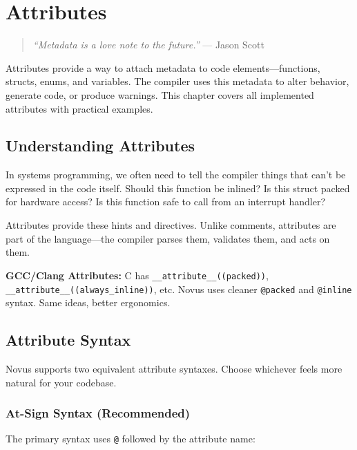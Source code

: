 \chapter{Attributes}
\label{ch:attributes}

\begin{quote}
\textit{``Metadata is a love note to the future.''} --- Jason Scott
\end{quote}

Attributes provide a way to attach metadata to code elements---functions, structs, enums, and variables. The compiler uses this metadata to alter behavior, generate code, or produce warnings. This chapter covers all implemented attributes with practical examples.

\section{Understanding Attributes}
\label{sec:understanding-attributes}

In systems programming, we often need to tell the compiler things that can't be expressed in the code itself. Should this function be inlined? Is this struct packed for hardware access? Is this function safe to call from an interrupt handler?

Attributes provide these hints and directives. Unlike comments, attributes are part of the language---the compiler parses them, validates them, and acts on them.

\begin{comingfromc}
\textbf{GCC/Clang Attributes:} C has \texttt{\_\_attribute\_\_((packed))}, \texttt{\_\_attribute\_\_((always\_inline))}, etc. Novus uses cleaner \texttt{@packed} and \texttt{@inline} syntax. Same ideas, better ergonomics.
\end{comingfromc}

\section{Attribute Syntax}
\label{sec:attribute-syntax}

Novus supports two equivalent attribute syntaxes. Choose whichever feels more natural for your codebase.

\subsection{At-Sign Syntax (Recommended)}

The primary syntax uses \texttt{@} followed by the attribute name:

